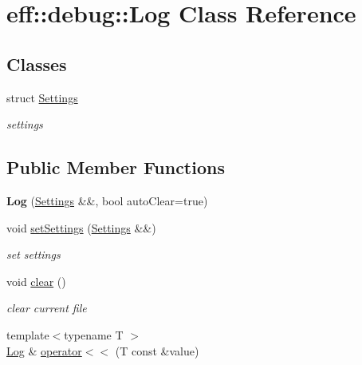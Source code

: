 \hypertarget{classeff_1_1debug_1_1Log}{}\section{eff\+:\+:debug\+:\+:Log Class Reference}
\label{classeff_1_1debug_1_1Log}
\subsection*{Classes}
\begin{DoxyCompactItemize}
\item 
struct \hyperlink{structeff_1_1debug_1_1Log_1_1Settings}{Settings}
\begin{DoxyCompactList}\small\item\em settings \end{DoxyCompactList}\end{DoxyCompactItemize}
\subsection*{Public Member Functions}
\begin{DoxyCompactItemize}
\item 
\mbox{\label{classeff_1_1debug_1_1Log_a2377971c124c24c10762866cbcdd222a}} 
{\bfseries Log} (\hyperlink{structeff_1_1debug_1_1Log_1_1Settings}{Settings} \&\&, bool auto\+Clear=true)
\item 
\mbox{\label{classeff_1_1debug_1_1Log_a9612cba8ed0b536c0fa0e462d22a6447}} 
void \hyperlink{classeff_1_1debug_1_1Log_a9612cba8ed0b536c0fa0e462d22a6447}{set\+Settings} (\hyperlink{structeff_1_1debug_1_1Log_1_1Settings}{Settings} \&\&)
\begin{DoxyCompactList}\small\item\em set settings \end{DoxyCompactList}\item 
\mbox{\label{classeff_1_1debug_1_1Log_ae8e21f6b9c3588008349375f2bdbfa6d}} 
void \hyperlink{classeff_1_1debug_1_1Log_ae8e21f6b9c3588008349375f2bdbfa6d}{clear} ()
\begin{DoxyCompactList}\small\item\em clear current file \end{DoxyCompactList}\item 
{\footnotesize template$<$typename T $>$ }\\\hyperlink{classeff_1_1debug_1_1Log}{Log} \& \hyperlink{classeff_1_1debug_1_1Log_a5adbb3064e6c035c3fdff199e85c22a2}{operator$<$$<$} (T const \&value)
\end{DoxyCompactItemize}



